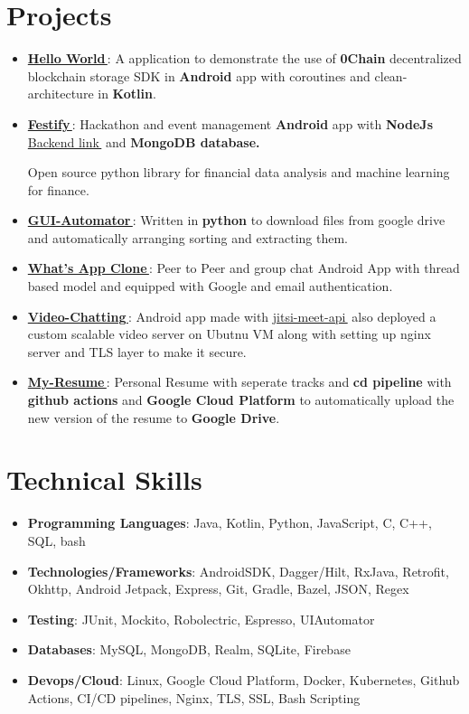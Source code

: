 \documentclass[letterpaper,1pt]{article}
\let\orighref\href
\renewcommand{\href}[2]{\orighref{#1}{#2\,\faExternalLink}}
\newcommand{\resumeItem}[2]{
  \item\small{
    \textbf{#1}{: #2 \vspace{-2pt}}
  }
}
\newcommand{\resumeSubHeadingListStart}{\begin{itemize}[leftmargin=*]}
\newcommand{\resumeSubHeadingListEnd}{\end{itemize}}
\begin{document}
\section{Projects}
\resumeSubHeadingListStart
\resumeItem{\href{https://github.com/0chain/HelloWorld-Android}{Hello World}}{A application to demonstrate the use of \textbf{0Chain} decentralized blockchain storage SDK in \textbf{Android} app with coroutines and clean-architecture in \textbf{Kotlin}.}
\resumeItem{\href{https://github.com/yash10019coder/festify-android}{Festify}}{Hackathon and event management \textbf{Android} app with \textbf{NodeJs} \href{https://github.com/yash10019coder/festify-node-server}{Backend link} and \textbf{MongoDB database.}}
{Open source python library for financial data analysis and machine learning for finance.}
\resumeItem{\href{https://github.com/yash10019coder/Gui-Automator}{GUI-Automator}}
{Written in \textbf{python} to download files from google drive and automatically arranging sorting and extracting them.}
\resumeItem{\href{https://github.com/yash10019coder/Whats-App}{What's App Clone}}
{Peer to Peer and group chat Android App with thread based model and equipped with Google and email authentication.}
\resumeItem{\href{https://github.com/yash10019coder/Video-Chatting}{Video-Chatting}}
{Android app made with \href{https://github.com/jitsi/jitsi-meet}{jitsi-meet-api} also deployed a custom scalable video server on Ubutnu VM along with setting up nginx server and TLS layer to make it secure.}
\resumeItem{\href{https://github.com/yash10019coder/resume}{My-Resume}}{Personal Resume with seperate tracks and \textbf{cd pipeline} with \textbf{github actions} and \textbf{Google Cloud Platform} to automatically upload the new version of the resume to \textbf{Google Drive}.}
\resumeSubHeadingListEnd

%
\section{Technical Skills}
\resumeSubHeadingListStart
\item{
            \textbf{Programming Languages}{: Java, Kotlin, Python, JavaScript, C, C++, SQL, bash}
      }
\item{
            \textbf{Technologies/Frameworks}{: AndroidSDK, Dagger/Hilt, RxJava, Retrofit, Okhttp, Android Jetpack, Express, Git, Gradle, Bazel, JSON, Regex}
      }
\item{
            \textbf{Testing}{: JUnit, Mockito, Robolectric, Espresso, UIAutomator}
      }
\item {
            \textbf{Databases}{: MySQL, MongoDB, Realm, SQLite, Firebase}
      }
\item{
            \textbf{Devops/Cloud}{: Linux, Google Cloud Platform, Docker, Kubernetes, Github Actions, CI/CD pipelines, Nginx, TLS, SSL, Bash Scripting}
      }
\resumeSubHeadingListEnd
\end{document}
